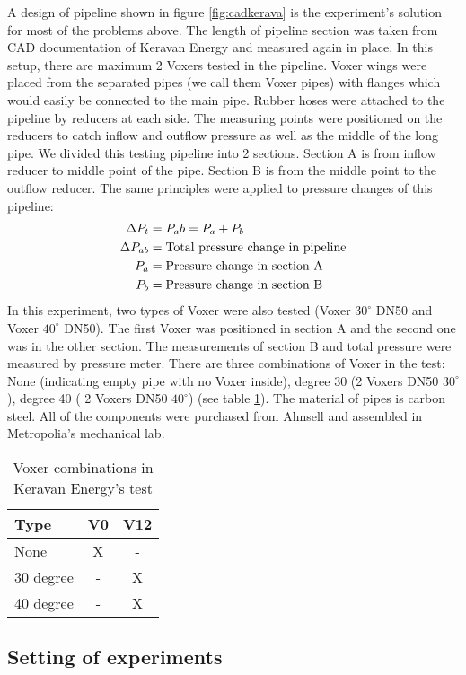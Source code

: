 A design of pipeline shown in figure \vref{fig:cadkerava} is the experiment's solution for most of the problems above. The length of pipeline section was taken from CAD documentation of Keravan Energy and measured again in place. In this setup, there are maximum 2 Voxers tested in the pipeline. Voxer wings were placed from the separated pipes (we call them Voxer pipes) with flanges which would easily be connected to the main pipe. 
Rubber hoses were attached to the pipeline by reducers at each side. The measuring points were positioned on the reducers to catch inflow and outflow pressure as well as the middle of the long pipe. We divided this testing pipeline into 2 sections. Section A is from inflow reducer to middle point of the pipe. Section B is from the middle point to the outflow reducer. The same principles were applied to pressure changes of this pipeline: 
\begin{align}
\Delta P_t&= P_ab = P_a + P_b \\
\Delta P_{ab}&= \textnormal{Total pressure change in pipeline} \\
P_a&= \textnormal{Pressure change in section A} \\
P_b&= \textnormal{Pressure change in section B} \\
\end{align}
In this experiment, two types of Voxer were also tested (Voxer $30^{\circ}$ DN50 and Voxer $40^{\circ}$ DN50). The first Voxer was positioned in section A and the second one was in the other section. The measurements of section B and total pressure were measured by pressure meter. There are three combinations of Voxer in the test: None (indicating empty pipe with no Voxer inside), degree 30 (2 Voxers DN50 $30^{\circ}$), degree 40 ( 2 Voxers DN50 $40^{\circ}$) (see table \ref{table:kerava}). The material of pipes is carbon steel. All of the components were purchased from Ahnsell and assembled in Metropolia's mechanical lab.
\begin{table}[h]
  \centering
  \caption{Voxer combinations in Keravan Energy's test}
  \begin{tabular}{l*{2}{c}}
Type             & V0 & V12 \\
\hline
None & X & -   \\
30 degree           & - & X   \\
40 degree          & - & X   \\
\end{tabular}
  \label{table:kerava}
\end{table}

\subsection{Setting of experiments}

